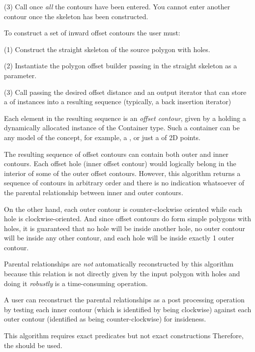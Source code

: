 (3) Call  once \textit{all} the contours have been entered. You
cannot enter another contour once the skeleton has been constructed.

To construct a set of inward offset contours the user must:
 
(1) Construct the straight skeleton of the source polygon with holes.

(2) Instantiate the polygon offset builder passing in the straight skeleton as a parameter.

(3) Call  passing the desired offset
    distance and an output iterator that can store a
     of  instances 
    into a resulting sequence (typically, a back insertion iterator)
    
Each element in the resulting sequence is an {\em offset contour}, given by
a  holding a dynamically allocated instance 
of the Container type. Such a container can be any model of the 
 concept, for example, a , 
or just a  of 2D points.

The resulting sequence of offset contours can contain both outer and inner contours. 
Each offset hole (inner offset contour) would logically belong in the interior of some 
of the outer offset contours.
However, this algorithm returns a sequence of contours in arbitrary order and there is no
indication whatsoever of the parental relationship between inner and outer contours.

On the other hand, each outer contour is counter-clockwise oriented while each hole is clockwise-oriented.
And since offset contours do form simple polygons with holes, it is guaranteed that no hole will be inside another hole, no outer contour will be inside any other contour, and each hole will be inside exactly 1 outer contour.

Parental relationships are {\em not} automatically reconstructed by this algorithm because this relation is not directly given by the input polygon with holes and doing it \textit{robustly} is a time-consuming operation.

A user can reconstruct the parental relationships as a post processing operation 
by testing each inner contour (which is identified by being clockwise) against each outer contour (identified as being counter-clockwise) for insideness.

This algorithm requires exact predicates but not exact constructions
Therefore, the  should be used.

